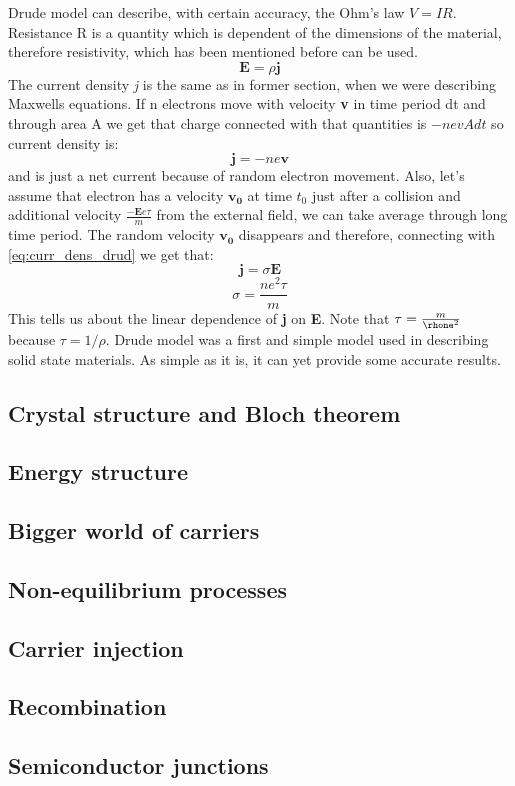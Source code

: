 Drude model can describe, with certain accuracy, the Ohm's law $V=IR$. Resistance R is a quantity which is dependent of the dimensions of the material, therefore resistivity, which has been mentioned before can be used.
\begin{equation}
\mathbf{E}=\rho\mathbf{j}
\end{equation}
The current density \textit{j} is the same as in former section, when we were describing Maxwells equations. If n electrons move with velocity \textbf{v} in time period dt and through area A we get that charge connected with that quantities is $-nevAdt$ so current density is:
\begin{equation}
\mathbf{j}=-ne\mathbf{v}
\label{eq:curr_dens_drud}
\end{equation}
and is just a net current because of random electron movement. 
Also, let's assume that electron has a velocity $\mathbf{v_0}$ at time $t_0$ just after a collision and additional velocity $\frac{-\mathbf{E}e\tau}{m}$ from the external field, we can take average through long time period. The random velocity $\mathbf{v_0}$ disappears and therefore, connecting with \ref{eq:curr_dens_drud} we get that:
\begin{equation}
\mathbf{j}=\sigma\mathbf{E}
\end{equation}
\begin{equation}
\sigma=\frac{ne^2\tau}{m}
\end{equation}
This tells us about the linear dependence of \textbf{j} on \textbf{E}. Note that $\tau = \frac{m}{\rhone^2}$ because $\tau = 1/\rho$.
Drude model was a first and simple model used in describing solid state materials. As simple as it is, it can yet provide some accurate results. 








\subsection{Crystal structure and Bloch theorem}

\subsection{Energy structure}

\subsection{Bigger world of carriers}

\subsection{Non-equilibrium processes}

\subsection{Carrier injection}

\subsection{Recombination}

\subsection{Semiconductor junctions}


